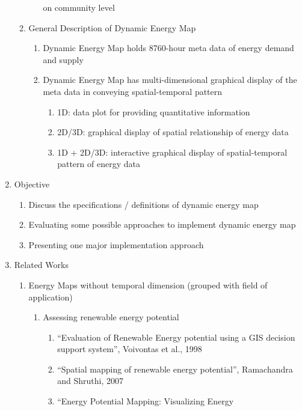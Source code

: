 \documentclass[12pt]{article}
\begin{document}
\begin{enumerate}
\begin{enumerate}[label*=\arabic*.]
\begin{enumerate}[label*=\arabic*.]
      on community level
    \end{enumerate}
  \item General Description of Dynamic Energy Map
    \begin{enumerate}[label*=\arabic*.]
    \item Dynamic Energy Map holds 8760-hour meta data of energy demand
      and supply
    \item Dynamic Energy Map has multi-dimensional graphical display of the
      meta data in conveying spatial-temporal pattern
      \begin{enumerate}[label*=\arabic*.]
      \item 1D: data plot for providing quantitative information
      \item 2D/3D: graphical display of spatial relationship of energy 
        data
      \item 1D + 2D/3D: interactive graphical display of
        spatial-temporal pattern of energy data
      \end{enumerate}
    \end{enumerate}
  \end{enumerate}
\item Objective
  \begin{enumerate}[label*=\arabic*.]
  \item Discuss the specifications / definitions of dynamic energy map
  \item Evaluating some possible approaches to implement dynamic
    energy map
  \item Presenting one major implementation approach
  \end{enumerate}
\item Related Works
  \begin{enumerate}[label*=\arabic*.]
  \item Energy Maps without temporal dimension (grouped with
    field of application)
    \begin{enumerate}[label*=\arabic*.]
    \item Assessing renewable energy potential
      \begin{enumerate}[label*=\arabic*.]
      \item ``Evaluation of Renewable Energy potential using a {GIS}
        decision support system'', Voivontas et al., 1998
      \item ``Spatial mapping of renewable energy potential'',
        Ramachandra and Shruthi, 2007
      \item ``Energy Potential Mapping: Visualizing Energy

\end{enumerate}
\end{enumerate}
\end{enumerate}
\end{enumerate}
\end{document}

